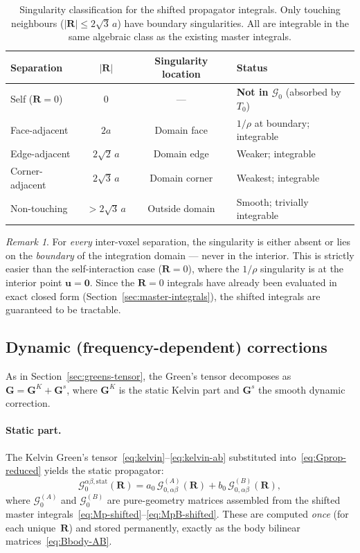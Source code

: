 \documentclass[11pt,a4paper]{article}
\newcommand{\bG}{\bm{G}}
\newcommand{\bu}{\bm{u}}
\newcommand{\bR}{\bm{R}}
\newcommand{\Gprop}{\mathcal{G}_0}
\theoremstyle{plain}
\theoremstyle{definition}
\theoremstyle{remark}
\newtheorem{remark}[theorem]{Remark}
\begin{document}
\begin{table}[ht]
\centering
\renewcommand{\arraystretch}{1.2}
\begin{tabular}{lccl}
\toprule
Separation & $|\bR|$ & Singularity location & Status \\
\midrule
Self ($\bR = 0$) & $0$ & ---
  & \textbf{Not in $\Gprop$} (absorbed by $T_0$) \\
Face-adjacent & $2a$ & Domain face
  & $1/\rho$ at boundary; integrable \\
Edge-adjacent & $2\sqrt{2}\,a$ & Domain edge
  & Weaker; integrable \\
Corner-adjacent & $2\sqrt{3}\,a$ & Domain corner
  & Weakest; integrable \\
Non-touching & $> 2\sqrt{3}\,a$ & Outside domain
  & Smooth; trivially integrable \\
\bottomrule
\end{tabular}
\caption{Singularity classification for the shifted propagator
integrals.  Only touching neighbours ($|\bR| \le 2\sqrt{3}\,a$)
have boundary singularities.  All are integrable in the same
algebraic class as the existing master integrals.}
\label{tab:singularity-prop}
\end{table}

\begin{remark}
For \emph{every} inter-voxel separation, the singularity is either
absent or lies on the \emph{boundary} of the integration domain ---
never in the interior.  This is strictly easier than the
self-interaction case ($\bR = 0$), where the $1/\rho$ singularity
is at the interior point $\bu = \bm{0}$.  Since the $\bR = 0$
integrals have already been evaluated in exact closed form
(Section~\ref{sec:master-integrals}), the shifted integrals are
guaranteed to be tractable.
\end{remark}


\subsection{Dynamic (frequency-dependent) corrections}
\label{sec:dynamic-prop}

As in Section~\ref{sec:greens-tensor}, the Green's tensor decomposes
as $\bG = \bG^K + \bG^s$, where $\bG^K$ is the static Kelvin part
and $\bG^s$ the smooth dynamic correction.

\paragraph{Static part.}
The Kelvin Green's tensor~\eqref{eq:kelvin}--\eqref{eq:kelvin-ab}
substituted into~\eqref{eq:Gprop-reduced} yields the static
propagator:
\begin{equation}
  \Gprop^{\alpha\beta,\mathrm{stat}}(\bR)
  = a_0\,\mathcal{G}_{0,\alpha\beta}^{(A)}(\bR)
  + b_0\,\mathcal{G}_{0,\alpha\beta}^{(B)}(\bR),
  \label{eq:Gprop-static}
\end{equation}
where $\Gprop^{(A)}$ and $\Gprop^{(B)}$ are pure-geometry matrices
assembled from the shifted master
integrals~\eqref{eq:Mp-shifted}--\eqref{eq:MpB-shifted}.  These are
computed \emph{once} (for each unique~$\bR$) and stored permanently,
exactly as the body bilinear matrices~\eqref{eq:Bbody-AB}.
\end{document}
